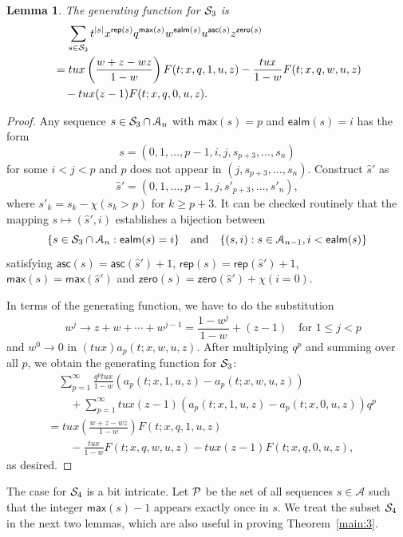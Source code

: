 \documentclass[12pt]{amsart}
\newcounter{mycount}
\theoremstyle{plain}
\newtheorem{lemma}[mycount]{Lemma}
\theoremstyle{definition}
\theoremstyle{example}
\theoremstyle{remark}
\numberwithin{equation}{section}
\numberwithin{figure}{section}
\newcommand{\asc}{\mathsf{asc}}
\def\max{\mathsf{max}}
\def\zero{\mathsf{zero}}
\def\rep{\mathsf{rep}}
\def\ealm{\mathsf{ealm}}
\def\A{\mathcal{A}}
\def\CS{ \CMcal{S}}
\begin{document}
\begin{lemma}\label{L:case3a}
The generating function for $\CS_3$ is
\begin{align}
&\,\quad \sum_{s\in\CS_3}t^{\vert s\vert}x^{\rep(s)}q^{\max(s)}w^{\ealm(s)}u^{\asc(s)}z^{\zero(s)}\label{eq:case3}\\
\nonumber&=tux\left(\frac{w+z-wz}{1-w}\right)F(t;x,q,1,u,z)-\frac{tux}{1-w}F(t;x,q,w,u,z)\\
\nonumber&\quad-tux(z-1)F(t;x,q,0,u,z).
\end{align}
\end{lemma}
\begin{proof}
Any sequence $s\in\CS_{3}\cap\A_n$ with $\max(s)=p$ and $\ealm(s)=i$ has the form
$$
s=(0,1,\ldots,p-1,i,j,s_{p+3},\ldots,s_n)
$$
 for some $i<j<p$ and $p$ does not appear in  $(j,s_{p+3},\ldots,s_n)$. Construct $\hat{s}'$ as
$$
 \hat{s}'=(0,1,\ldots,p-1,j,s'_{p+3},\ldots,s'_n),
$$
where $s'_k=s_k-\chi(s_k>p)$ for $k\geq p+3$. It can be checked routinely that the mapping $s\mapsto (\hat{s}',i)$ establishes a bijection between
$$
\{s\in\CS_3\cap\A_{n}:\ealm(s)=i\}\quad\text{and}\quad\{(s,i): s\in\A_{n-1}, i<\ealm(s)\}
$$
 satisfying
$
\asc(s)=\asc(\hat{s}')+1$, $\rep(s)=\rep(\hat{s}')+1$, $\max(s)=\max(\hat{s}')$ and $\zero(s)=\zero(\hat{s}')+\chi(i=0)$.

In terms of the generating function, we have to do the substitution
$$
\quad w^j\rightarrow z+w+\cdots+w^{j-1}=\frac{1-w^j}{1-w}+(z-1)\quad \text{for  $1\le j<p$}
$$
and $w^0\rightarrow 0$ in $(tux)a_p(t;x,w,u,z)$. After multiplying $q^p$ and summing over all $p$,  we obtain the generating function for $\CS_3$:
\begin{align*}
&\quad\sum_{p=1}^{\infty}\frac{q^ptux}{1-w}(a_p(t;x,1,u,z)-a_p(t;x,w,u,z))\\
&\quad\quad+\sum_{p=1}^{\infty}tux(z-1)(a_p(t;x,1,u,z)-a_p(t;x,0,u,z))q^p\\
&=tux\left(\frac{w+z-wz}{1-w}\right)F(t;x,q,1,u,z)\\
&\quad\quad-\frac{tux}{1-w}F(t;x,q,w,u,z)-tux(z-1)F(t;x,q,0,u,z),
\end{align*}
as desired.
\end{proof}




The case for $\CS_4$ is a bit intricate. Let $\CMcal{P}$ be the set of all sequences $s\in\A$ such that the integer $\max(s)-1$ appears exactly once in $s$.
We treat the subset $\CS_4$ in the next two lemmas, which are also useful in proving Theorem~\ref{main:3}.
\end{document}
